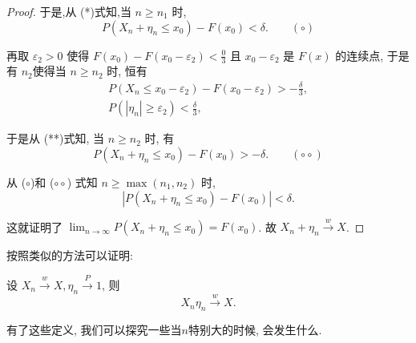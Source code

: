 {{\begin{proof}
于是,从 (*)式知,当 $n \geq n_1$ 时,
$$
P\left(X_n+\eta_n \leq x_0\right)-F\left(x_0\right)<\delta . \qquad (\circ)
$$

再取 $\varepsilon_2>0$ 使得 $F\left(x_0\right)-F\left(x_0-\varepsilon_2\right)<\frac{0}{3}$ 且 $x_0-\varepsilon_2$ 是 $F(x)$ 的连续点, 于是有 $n_2$使得当 $n \geq n_2$ 时, 恒有
$$
\begin{gathered}
P\left(X_n \leq x_0-\varepsilon_2\right)-F\left(x_0-\varepsilon_2\right)>-\frac{\delta}{3}, \\
P\left(\left|\eta_n\right| \geq \varepsilon_2\right)<\frac{\delta}{3},
\end{gathered}
$$

于是从 (**)式知, 当 $n \geq n_2$ 时, 有
$$
P\left(X_n+\eta_n \leq x_0\right)-F\left(x_0\right)>-\delta . \quad \quad (\circ\circ)
$$

从 ($\circ$)和 ($\circ\circ$) 式知 $n \geq \max \left(n_1, n_2\right)$ 时,
$$
\left|P\left(X_n+\eta_n \leq x_0\right)-F\left(x_0\right)\right|<\delta .
$$

这就证明了 $\lim _{n \rightarrow \infty} P\left(X_n+\eta_n \leq x_0\right)=F\left(x_0\right)$. 故 $X_n+\eta_n \stackrel{w}{\longrightarrow} X$.
\end{proof}
}}
按照类似的方法可以证明: 
\begin{theorem}
    设 $X_n \stackrel{w}{\longrightarrow} X, \eta_n \stackrel{P}{\longrightarrow} 1$, 则
$$
X_n \eta_n \stackrel{w}{\longrightarrow} X .
$$
\end{theorem}

有了这些定义, 我们可以探究一些当$n$特别大的时候, 会发生什么.